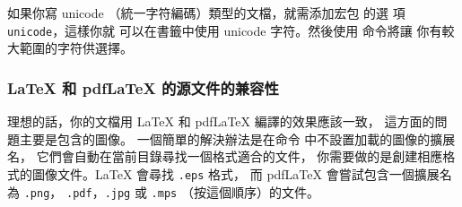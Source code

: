 如果你寫 unicode （統一字符編碼）類型的文檔，就需添加宏包  的選
項 \verb+unicode+，這樣你就
可以在書籤中使用 unicode 字符。然後使用  命令將讓
你有較大範圍的字符供選擇。

\subsubsection{\LaTeX{} 和 pdf\LaTeX{} 的源文件的兼容性}
\label{sec:pdfcompat}


理想的話，你的文檔用 \LaTeX{} 和 pdf\LaTeX{} 編譯的效果應該一致，
這方面的問題主要是包含的圖像。
一個簡單的解決辦法是在命令  中不設置加載的圖像的擴展名，
它們會自動在當前目錄尋找一個格式適合的文件，
你需要做的是創建相應格式的圖像文件。\LaTeX{} 會尋找 \texttt{.eps} 格式，
而 pdf\LaTeX{} 會嘗試包含一個擴展名 為 \texttt{.png}，
\texttt{.pdf}，\texttt{.jpg} 或 \texttt{.mps} （按這個順序）的文件。


